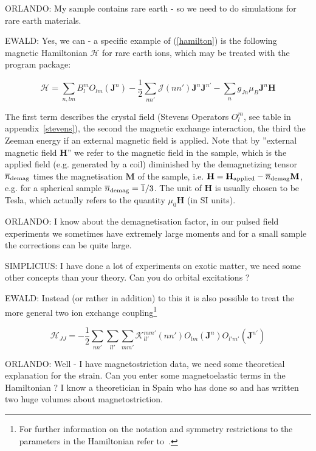 \documentclass[twoside]{article}
\newcommand{\m}[1]{\overline{#1}}
\newcommand{\mbf}[1]{\mathbf #1}
\newcommand{\OO}{\hspace*{-1cm} ORLANDO: }
\newcommand{\EE}{\hspace*{-1cm} EWALD: }
\newcommand{\PP}{\hspace*{-1cm} SIMPLICIUS: }
\begin{document}
\OO My sample contains rare earth - so we need to do simulations for rare earth materials.

\EE Yes, we can -
a specific example of (\ref{hamilton}) is the following magnetic  Hamiltonian $\mathcal H$ for rare earth ions,
 which may be treated with the program package:

\begin{equation}
\label{hamiltonre}
 {\mathcal H}= \sum_{n,lm} B_l^m O_{lm}({\mbf J}^n) 
             -\frac{1}{2}  \sum_{nn'} {\mathcal J}(nn') {\mbf J}^n{\mbf J}^{n'}
	     - \sum_{n} g_{Jn} \mu_B {\mbf J}^n {\mbf H} 
\end{equation}

The first term describes the crystal field (Stevens Operators $O_l^m$, see table in appendix~\ref{stevens}), the second %
the magnetic
exchange interaction, the third the Zeeman energy if an external magnetic field is applied.
Note that by ''external magnetic field $\mbf H$'' we refer to the magnetic field in the sample, 
which is the applied field (e.g. generated by a coil) diminished by 
the demagnetizing tensor $\m{n}_{\rm demag}$ times the magnetisation $\mbf M$ of the sample, i.e. 
$\mbf H= \mbf H_{\rm applied} - \m{n}_{\rm demag} \mbf M$, e.g. for a spherical sample $\m{n}_{\rm demag}=\m{1}/3$. 
The unit of $\mbf H$ is usually chosen to be Tesla, which actually refers to the quantity 
$\mu_0 \mbf H$ (in SI units). 

\OO I know about the demagnetisation factor, in our pulsed field experiments we sometimes
have extremely large moments and for a small sample the corrections can be quite large.

\PP I have done a lot of experiments on exotic matter, we need some other concepts than
your theory. Can you do orbital excitations ? 

\EE Instead (or rather in addition) to this it is also possible to treat the 
more general two ion exchange coupling\footnote{For further information on the notation and symmetry restrictions to the
parameters in the Hamiltonian refer to~\cite{jensen91-1}.}

\begin{equation}
\label{multipolehamilton}
 {\mathcal H}_{JJ}=
             -\frac{1}{2}  \sum_{nn'} \sum_ {ll'} \sum_{mm'}
	     {\mathcal K}_{ll'}^{mm'}(nn') O_{lm}({\mbf J}^n) O_{l'm'}({\mbf J}^{n'})
\end{equation}

\OO Well - I have magnetostriction data, we need some theoretical explanation for the strain. 
 Can you enter some magnetoelastic terms in the Hamiltonian ? I know a theoretician in Spain who has
done so and has written two huge volumes about magnetostriction. 
\end{document}

